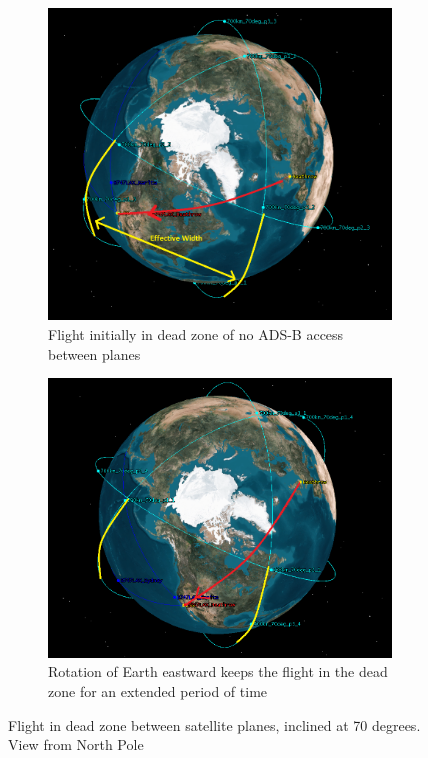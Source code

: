 \begin{figure}[htpb]
	\centering
	\begin{subfigure}[b]{0.6\textwidth}
	
	\includegraphics[width=\textwidth]{Pictures/70_deg_precess_1_edited.png}
	
	\caption{Flight initially in dead zone of no ADS-B access between planes}
	\label{fig:70_deg_precess_1_edited}
	\end{subfigure}
	
	\begin{subfigure}[b]{0.6\textwidth}
	\includegraphics[width=\textwidth]{Pictures/70_deg_precess_2_edited.png}
	
	
	\caption{Rotation of Earth eastward keeps the flight in the dead zone for an extended period of time}
	\label{fig:70_deg_precess_2_edited}
	\end{subfigure}
		
	
	\caption{Flight in dead zone between satellite planes, inclined at 70 degrees. View from North Pole}
\end{figure} 